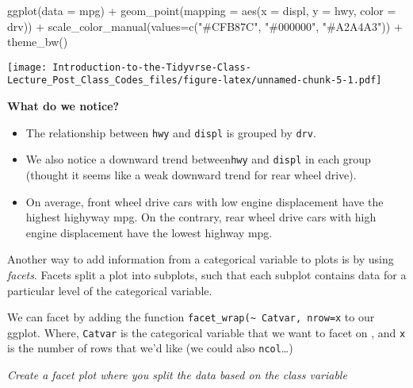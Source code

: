 \documentclass[
]{article}
\newenvironment{Shaded}{\begin{snugshade}}{\end{snugshade}}
\newcommand{\AttributeTok}[1]{\textcolor[rgb]{0.77,0.63,0.00}{#1}}
\newcommand{\FunctionTok}[1]{\textcolor[rgb]{0.00,0.00,0.00}{#1}}
\newcommand{\NormalTok}[1]{#1}
\newcommand{\SpecialCharTok}[1]{\textcolor[rgb]{0.00,0.00,0.00}{#1}}
\newcommand{\StringTok}[1]{\textcolor[rgb]{0.31,0.60,0.02}{#1}}
\begin{document}
\begin{Shaded}
\begin{Highlighting}[]
\FunctionTok{ggplot}\NormalTok{(}\AttributeTok{data =}\NormalTok{ mpg) }\SpecialCharTok{+} 
  \FunctionTok{geom\_point}\NormalTok{(}\AttributeTok{mapping =} \FunctionTok{aes}\NormalTok{(}\AttributeTok{x =}\NormalTok{ displ, }\AttributeTok{y =}\NormalTok{ hwy, }\AttributeTok{color =}\NormalTok{ drv)) }\SpecialCharTok{+}
      \FunctionTok{scale\_color\_manual}\NormalTok{(}\AttributeTok{values=}\FunctionTok{c}\NormalTok{(}\StringTok{"\#CFB87C"}\NormalTok{, }\StringTok{"\#000000"}\NormalTok{, }\StringTok{"\#A2A4A3"}\NormalTok{)) }\SpecialCharTok{+}
 \FunctionTok{theme\_bw}\NormalTok{()}
\end{Highlighting}
\end{Shaded}

\texttt{[image: Introduction-to-the-Tidyvrse-Class-Lecture\_Post\_Class\_Codes\_files/figure-latex/unnamed-chunk-5-1.pdf]}

\textbf{What do we notice?}

\begin{itemize}
\item
  The relationship between \texttt{hwy} and \texttt{displ} is grouped by
  \texttt{drv}.
\item
  We also notice a downward trend between\texttt{hwy} and \texttt{displ}
  in each group (thought it seems like a weak downward trend for rear
  wheel drive).
\item
  On average, front wheel drive cars with low engine displacement have
  the highest highyway mpg. On the contrary, rear wheel drive cars with
  high engine displacement have the lowest highway mpg.
\end{itemize}

Another way to add information from a categorical variable to plots is
by using \emph{facets}. Facets split a plot into subplots, such that
each subplot contains data for a particular level of the categorical
variable.

We can facet by adding the function
\texttt{facet\_wrap(\textasciitilde{}\ Catvar,\ nrow=x} to our ggplot.
Where, \texttt{Catvar} is the categorical variable that we want to facet
on , and \texttt{x} is the number of rows that we'd like (we could also
\texttt{ncol}\ldots)

\emph{Create a facet plot where you split the data based on the class
variable}
\end{document}
